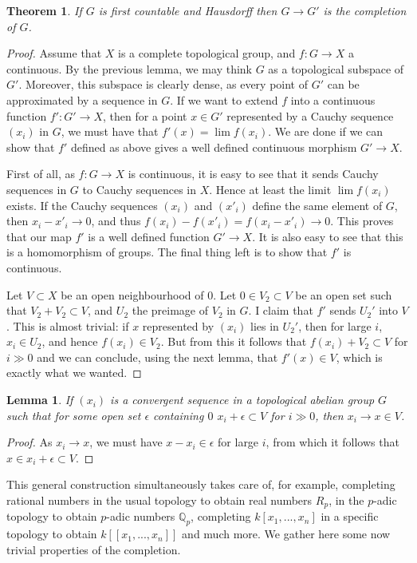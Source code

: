 \documentclass[12pt,a4paper,leqno]{article}
\newcommand{\Q}{\mathbb{Q}}
\theoremstyle{plain}
\newtheorem{thm}[theo]{Theorem}
\newtheorem{lem}[theo]{Lemma}
\theoremstyle{definition}
\theoremstyle{remark}
\begin{document}
\begin{thm}
If $G$ is first countable and Hausdorff then $G \to G'$ is the completion of $G$.
\end{thm}
\begin{proof}
Assume that $X$ is a complete topological group, and $f: G \to X$ a continuous. By the previous lemma, we may think $G$ as a topological subspace of $G'$. Moreover, this subspace is clearly dense, as every point of $G'$ can be approximated by a sequence in $G$. If we want to extend $f$ into a continuous function $f' : G' \to X$, then for a point $x \in G'$ represented by a Cauchy sequence $(x_i)$ in $G$, we must have that $f' (x) = \lim f(x_i)$. We are done if we can show that $f'$ defined as above gives a well defined continuous morphism $G' \to X$.

First of all, as $f: G \to X$ is continuous, it is easy to see that it sends Cauchy sequences in $G$ to Cauchy sequences in $X$. Hence at least the limit $\lim f(x_i)$ exists. If the Cauchy sequences $(x_i)$ and $(x'_i)$ define the same element of $G$, then $x_i - x'_i \to 0$, and thus $f(x_i) - f(x'_i) = f(x_i - x'_i) \to 0$. This proves that our map $f'$ is a well defined function $G' \to X$. It is also easy to see that this is a homomorphism of groups. The final thing left is to show that $f'$ is continuous.

Let $V \subset X$ be an open neighbourhood of $0$. Let $0 \in V_2 \subset V$ be an open set such that $V_2 + V_2 \subset V$, and $U_2$ the preimage of $V_2$ in $G$. I claim that $f'$ sends $U_2'$ into $V$. This is almost trivial: if $x$ represented by $(x_i)$ lies in $U_2'$, then for large $i$, $x_i \in U_2$, and hence $f(x_i) \in V_2$. But from this it follows that $f(x_i) + V_2 \subset V$ for $i \gg 0$ and we can conclude, using the next lemma, that $f'(x) \in V$, which is exactly what we wanted. 
\end{proof}

\begin{lem}
If $(x_i)$ is a convergent sequence in a topological abelian group $G$ such that for some open set $\epsilon$ containing $0$ $x_i + \epsilon \subset V$ for $i \gg 0$, then $x_i \to x \in V$.
\end{lem}
\begin{proof}
As $x_i \to x$, we must have $x - x_i \in \epsilon$ for large $i$, from which it follows that $x \in x_i + \epsilon \subset V$.
\end{proof}

This general construction simultaneously takes care of, for example, completing rational numbers in the usual topology to obtain real numbers $R_p$, in the $p$-adic topology to obtain $p$-adic numbers $\Q_p$, completing $k[x_1,...,x_n]$ in a specific topology to obtain $k[[x_1,...,x_n]]$ and much more. We gather here some now trivial properties of the completion.
\end{document}
